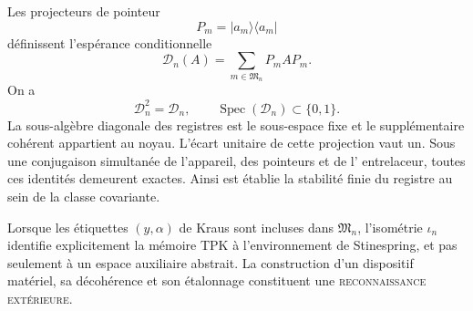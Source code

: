 Les projecteurs de pointeur
\[
 P_m=|a_m\rangle\langle a_m|
\]
définissent l'espérance conditionnelle
\[
 \mathcal D_n(A)=\sum_{m\in\mathfrak M_n}P_m A P_m.
\]
On a
\[
 \mathcal D_n^2=\mathcal D_n,\qquad
 \operatorname{Spec}(\mathcal D_n)\subset\{0,1\}.
\]
La sous-algèbre diagonale des registres est le sous-espace fixe et le supplémentaire
cohérent appartient au noyau. L'écart unitaire de cette projection vaut un.
Sous une conjugaison simultanée de l'appareil, des pointeurs et de l'
entrelaceur, toutes ces identités demeurent exactes. Ainsi est établie
la stabilité finie du registre au sein de la classe covariante.

Lorsque les étiquettes \((y,\alpha)\) de Kraus sont incluses dans
\(\mathfrak M_n\), l'isométrie \(\iota_n\) identifie explicitement la
mémoire TPK à l'environnement de Stinespring, et pas seulement à un espace auxiliaire
abstrait. La construction d'un dispositif matériel, sa décohérence et
son étalonnage constituent une \textsc{reconnaissance extérieure}.


